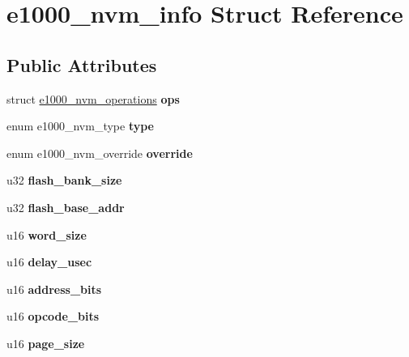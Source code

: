 \hypertarget{structe1000__nvm__info}{
\section{e1000\_\-nvm\_\-info Struct Reference}
\label{structe1000__nvm__info}
}
\subsection*{Public Attributes}
\begin{DoxyCompactItemize}
\item 
\hypertarget{structe1000__nvm__info_a039acf6f4fa4fe5e22111f6a03253b4a}{
struct \hyperlink{structe1000__nvm__operations}{e1000\_\-nvm\_\-operations} {\bfseries ops}}
\label{structe1000__nvm__info_a039acf6f4fa4fe5e22111f6a03253b4a}

\item 
\hypertarget{structe1000__nvm__info_a054b50b823dd73ce0b1dc10949efca08}{
enum e1000\_\-nvm\_\-type {\bfseries type}}
\label{structe1000__nvm__info_a054b50b823dd73ce0b1dc10949efca08}

\item 
\hypertarget{structe1000__nvm__info_a87ef804c2d1820009ac5741c29eb28ec}{
enum e1000\_\-nvm\_\-override {\bfseries override}}
\label{structe1000__nvm__info_a87ef804c2d1820009ac5741c29eb28ec}

\item 
\hypertarget{structe1000__nvm__info_a55cb2797b6aebd77214289458c16d62d}{
u32 {\bfseries flash\_\-bank\_\-size}}
\label{structe1000__nvm__info_a55cb2797b6aebd77214289458c16d62d}

\item 
\hypertarget{structe1000__nvm__info_a43e1b73aa01079e04a72d6a762c78de6}{
u32 {\bfseries flash\_\-base\_\-addr}}
\label{structe1000__nvm__info_a43e1b73aa01079e04a72d6a762c78de6}

\item 
\hypertarget{structe1000__nvm__info_afaf26405015b9a7d05c646a1f6567f87}{
u16 {\bfseries word\_\-size}}
\label{structe1000__nvm__info_afaf26405015b9a7d05c646a1f6567f87}

\item 
\hypertarget{structe1000__nvm__info_aa8bc2fd2df583379a8a72046144f7ada}{
u16 {\bfseries delay\_\-usec}}
\label{structe1000__nvm__info_aa8bc2fd2df583379a8a72046144f7ada}

\item 
\hypertarget{structe1000__nvm__info_ae6a7da98b5a96c2cb7e64c42f6e62f5e}{
u16 {\bfseries address\_\-bits}}
\label{structe1000__nvm__info_ae6a7da98b5a96c2cb7e64c42f6e62f5e}

\item 
\hypertarget{structe1000__nvm__info_a6921f34e18ffe55fc97e0ec1db18bf00}{
u16 {\bfseries opcode\_\-bits}}
\label{structe1000__nvm__info_a6921f34e18ffe55fc97e0ec1db18bf00}

\item 
\hypertarget{structe1000__nvm__info_ad76f3d175d39a5cb91fd179e7a65fdb4}{
u16 {\bfseries page\_\-size}}
\label{structe1000__nvm__info_ad76f3d175d39a5cb91fd179e7a65fdb4}

\end{DoxyCompactItemize}


